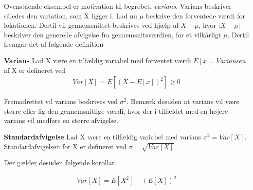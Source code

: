 Ovenstående eksempel er motivation til begrebet, \textit{varians}. Varians beskriver således den variation, som X ligger i. Lad nu $\mu$ beskrive den forventede værdi for lokationen. Dertil vil gennemsnittet beskrives ved hjælp af $X - \mu$, hvor $|X-\mu|$ beskriver den generelle afvigelse fra gennemsnitsværdien, for et vilkårligt $\mu$.
Dertil fremgår det af følgende definition

\begin{minipage}\textwidth
\begin{defn}\textbf{Varians}\label{def:varians} %
\newline
Lad X være en tilfældig variabel med forventet værdi $E[x]$. \textit{Variansen} af X er defineret ved
\begin{align*}
    Var[X]=E[(X-E[x])^2] \geq 0
\end{align*}
\end{defn}
\end{minipage}

Fremadrettet vil varians beskrives ved $\sigma^2$. Bemærk desuden at varians vil være større eller lig den gennemsnitlige værdi, hvor der i tilfældet med en højere varians vil medføre en større afvigelse.


\begin{minipage}\textwidth
\begin{defn}\textbf{Standardafvigelse} %
\newline
Lad X være en tilfældig variabel med varians $\sigma^2 = Var[X]$. Standardafvigelsen for X er defineret ved $\sigma = \sqrt{Var[X]}$
\end{defn}
\end{minipage}


Der gælder desuden følgende korollar 

\begin{minipage}\textwidth
\begin{kor} \textbf{} %
\newline
\begin{align*}
    Var[X]=E[X^2] - (E[X])^2
\end{align*}
\end{kor}
\end{minipage}

